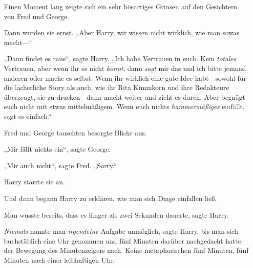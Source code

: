 Einen Moment lang zeigte sich ein sehr bösartiges Grinsen auf den Gesichtern von Fred und George.

Dann wurden sie ernst. „Aber Harry, wir wissen nicht wirklich, wie man sowas macht—“

„Dann findet es raus“, sagte Harry. „Ich habe Vertrauen in euch. Kein \emph{totales} Vertrauen, aber wenn ihr es nicht \emph{könnt}, dann \emph{sagt} mir das und ich bitte jemand anderen oder mache es selbst. Wenn ihr wirklich eine gute Idee habt—sowohl für die lächerliche Story als auch, wie ihr Rita Kimmkorn und ihre Redakteure überzeugt, sie zu drucken—dann macht weiter und zieht es durch. Aber begnügt euch nicht mit etwas mittelmäßigem. Wenn euch nichts \emph{hammermäßiges} einfällt, sagt es einfach.“

Fred und George tauschten besorgte Blicke aus.

„Mir fällt nichts ein“, sagte George.

„Mir auch nicht“, sagte Fred. „Sorry.“

Harry starrte sie an.

Und dann begann Harry zu erklären, wie man sich Dinge einfallen ließ.

Man wusste bereits, dass es länger als zwei Sekunden dauerte, sagte Harry.

\emph{Niemals} nannte man \emph{irgendeine} Aufgabe unmöglich, sagte Harry, bis man sich buchstäblich eine Uhr genommen und fünf Minuten darüber nachgedacht hatte, der Bewegung des Minutenzeigers nach. Keine metaphorischen fünf Minuten, fünf Minuten nach einer leibhaftigen Uhr.


